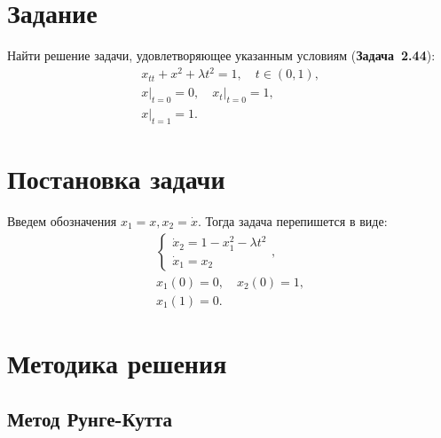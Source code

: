 \documentclass[a4paper,12pt]{article}
\newcommand{\UpdateMe}[1]{\textcolor{red}{#1}}
\newcommand{\University}{Московский государственный университет имени М.~В.~Ломоносова}
\newcommand{\Department}{Кафедра \UpdateMe{НАЗВАНИЕ-КАФЕДРЫ}}
\newcommand{\Student}{\UpdateMe{ИМЯ-СТУДЕНТА}}
\newcommand{\GroupNum}{\UpdateMe{НОМЕР}}
\newcommand{\Seminar}{\UpdateMe{НАЗВАНИЕ-ПРАКТИКУМА}}
\begin{document}

\section*{Задание}
Найти решение задачи, удовлетворяющее указанным условиям ({\bfseries Задача~2.44}):
\begin{gather*}
  x_{tt}+x^2+\lambda t^2=1, \quad t\in(0, 1),\\
  \left.x\right\vert_{t=0}=0, \quad \left.x_{t}\right\vert_{t=0}=1,\\
  \left.x\right\vert_{t=1}=1.
\end{gather*}

\section*{Постановка задачи}

Введем обозначения \(x_1 = x, x_2=\dot{x}\). Тогда задача перепишется в виде:
\begin{gather}
  \label{common_system} \begin{cases}\dot{x}_2=1-x_1^2-\lambda t^2\\ \dot{x}_1=x_2 \end{cases},\\
  \label{left_conditions} x_1(0) = 0, \quad x_2(0)=1,\\
  \label{right_conditions} x_1(1) = 0.
\end{gather}

\section*{Методика решения}

\subsection*{Метод Рунге-Кутта}
\end{document}
